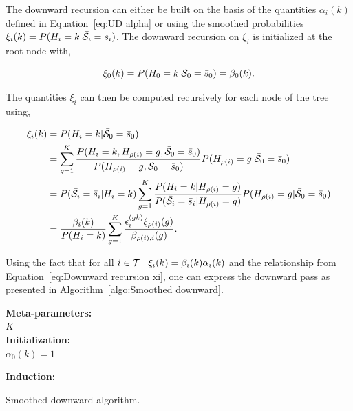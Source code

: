 \documentclass[a4paper,11pt]{report}
\begin{document}
				The downward recursion can either be built on the basis of the quantities $\alpha_{i}(k)$ defined in Equation~\ref{eq:UD alpha} or using the smoothed probabilities $\xi_{i}(k) = P(H_{i}=k | \bar{\mathcal{S}}_{i}= \bar{s}_{i})$. The downward recursion on $\xi_{i}$ is initialized at the root node with,
				
				\begin{equation}
				  \xi_{0}(k)= P(H_{0}=k | \bar{\mathcal{S}}_{0}=\bar{s}_{0}) = \beta_{0}(k).
				  \label{eq:Downward init}
				\end{equation}

				The quantities $\xi_{i}$ can then be computed recursively for each node of the tree using,
				
				\begin{equation}
					\begin{split}
						\xi_{i}(k)	&= P(H_{i}=k | \bar{\mathcal{S}}_{0}=\bar{s}_{0}) \\
												&= \sum_{g=1}^{K} \frac{P(H_{i}=k, H_{\rho(i)}=g, \bar{\mathcal{S}}_{0}= \bar{s}_{0})}{P(H_{\rho(i)}=g, \bar{\mathcal{S}}_{0}= \bar{s}_{0})} P(H_{\rho(i)}=g | \bar{\mathcal{S}}_{0}= \bar{s}_{0})\\
												&= P(\bar{\mathcal{S}}_{i}= \bar{s}_{i} | H_{i}=k)  
													 \sum_{g=1}^{K} \frac{P(H_{i}=k | H_{\rho(i)}=g)}{P(\bar{\mathcal{S}}_{i}= \bar{s}_{i} | H_{\rho(i)}=g)}
 													 P(H_{\rho(i)}=g | \bar{\mathcal{S}}_{0}= \bar{s}_{0})\\
 												&= \frac{\beta_{i}(k)}{P(H_{i}=k)} \sum_{g=1}^{K} \frac{ \epsilon_{i}^{(gk)} \xi_{\rho(i)}(g)}{\beta_{\rho(i),i}(g)}.
						\end{split}
						\label{eq:Downward recursion xi}
				\end{equation}
				
				Using the fact that for all $i \in \mathcal{T} \;\;\; \xi_{i}(k) = \beta_{i}(k)\alpha_{i}(k)$ and the relationship from Equation~\ref{eq:Downward recursion xi}, one can express the downward pass as presented in Algorithm~\ref{algo:Smoothed downward}.
    
				\begin{center}
					\begin{algorithm}
						\textbf{Meta-parameters:}\\
							$K$\\
								
						\textbf{Initialization:}\\
							$\alpha_{0}(k) = 1$
								
						\textbf{Induction:}\\
						\caption{Smoothed downward algorithm.}
						\label{algo:Smoothed downward}		
					\end{algorithm}        
				\end{center}
				
\end{document}
